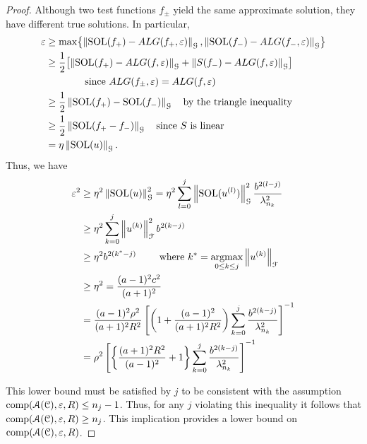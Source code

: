 \documentclass[USenglish]{article}
\theoremstyle{dgthm}
\theoremstyle{dgthm}
\theoremstyle{dgthm}
\theoremstyle{dgthm}
\theoremstyle{dgdef}
\DeclareMathOperator{\SOL}{SOL}
\newcommand{\norm}[2][{}]{\ensuremath{\left \lVert #2 \right \rVert}_{#1}}
\begin{document}
\begin{proof}
Although two test functions $f_\pm$ yield the same approximate solution, they have different true solutions.  In particular,
\begin{align*}
\varepsilon &\ge \max \bigl\{\norm[\calG]{\SOL(f_+) - ALG(f_+,\varepsilon)}, \norm[\calG]{\SOL(f_-) - ALG(f_-,\varepsilon)} \bigr\} \\
&\ge \frac 12 \bigl[\norm[\calG]{\SOL(f_+) - ALG(f,\varepsilon)} + \norm[\calG]{S(f_-) - ALG(f,\varepsilon)}  \bigr] \\
&\qquad \qquad \text{since } ALG(f_\pm,\varepsilon) = ALG(f,\varepsilon) \\
&\ge \frac 12 \norm[\calG]{\SOL(f_+) - \SOL(f_-)} \quad \text{by the triangle inequality}\\
&\ge \frac 12 \norm[\calG]{\SOL(f_+ - f_-)} \quad \text{since $S$ is linear}\\
&= \eta \norm[\calG]{\SOL(u)}.
\end{align*}
Thus, we have
\begin{align*}
\varepsilon^2  & \ge \eta^2 \norm[\calG]{\SOL(u)}^2= 
\eta^2 \sum_{l=0}^{j} \norm[\calG]{\SOL(u^{(l)})}^2  \frac{b^{2(l-j)}}{\lambda_{n_k}^2}\\
& \ge \eta^2 
\sum_{k=0}^{j} \norm[\calF]{u^{(k)}}^2 
b^{2(k-j)}\\
& \ge  \eta^2 b^{2(k^{*}-j)} \qquad \text{ where } k^* = \argmax_{0 \le k \le j} \norm[\calF]{u^{(k)}} \\
& \ge \eta^2 = \frac{(a-1)^2c^2}{(a+1)^2} \\
&
=\frac{(a-1)^2 \rho^2}{(a+1)^2R^2}\left[\left(1+\frac{(a-1)^2}{(a+1)^{2} R^2 }\right)\sum_{k=0}^j \frac{b^{2(k-j)}}{\lambda_{n_{k}}^2}\right]^{-1} \\
& =  \rho^2 \left[\left\{\frac{(a+1)^{2} R^2 }{(a-1)^2} + 1\right\}\sum_{k=0}^j \frac{b^{2(k-j)}}{\lambda_{n_{k}}^2}\right]^{-1} 
\end{align*}

This lower bound must be satisfied by $j$ to be consistent with the assumption $\textup{comp}({\mathcal{A}}({\mathcal{C}}),\varepsilon,R) \leq n_j - 1$.  Thus, for any $j$ violating this inequality it follows that $\textup{comp}({\mathcal{A}}({\mathcal{C}}),\varepsilon,R) \geq n_j$.  This implication provides a lower bound on $\textup{comp}({\mathcal{A}}({\mathcal{C}}),\varepsilon,R)$.
\end{proof}
\end{document}
